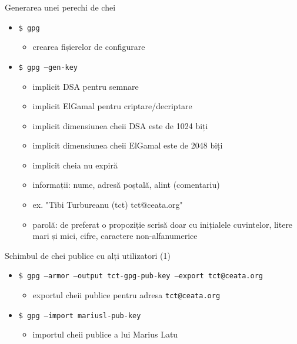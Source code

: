 \documentclass{beamer}
\begin{document}
\begin{frame}{Generarea unei perechi de chei}
  \begin{itemize}
    \item \texttt{\$ gpg}
    \begin{itemize}
      \item crearea fișierelor de configurare
    \end{itemize}
    \item \texttt{\$ gpg --gen-key}
    \begin{itemize}
      \item implicit DSA pentru semnare
      \item implicit ElGamal pentru criptare/decriptare
      \item implicit dimensiunea cheii DSA este de 1024 biți
      \item implicit dimensiunea cheii ElGamal este de 2048 biți
      \item implicit cheia nu expiră
      \item informații: nume, adresă poștală, alint (comentariu)
      \item ex. "Tibi Turbureanu (tct) tct@ceata.org"
      \item parolă: de preferat o propoziție scrisă doar cu inițialele
      cuvintelor, litere mari și mici, cifre, caractere non-alfanumerice
    \end{itemize}
  \end{itemize}
\end{frame}

\begin{frame}{Schimbul de chei publice cu alți utilizatori (1)}
  \begin{itemize}
    \item \texttt{\$ gpg --armor --output tct-gpg-pub-key --export
    tct@ceata.org}
    \begin{itemize}
      \item exportul cheii publice pentru adresa \texttt{tct@ceata.org}
    \end{itemize}
    \item \texttt{\$ gpg --import mariusl-pub-key}
    \begin{itemize}
      \item importul cheii publice a lui Marius Latu
    \end{itemize}
  \end{itemize}
\end{frame}
\end{document}
